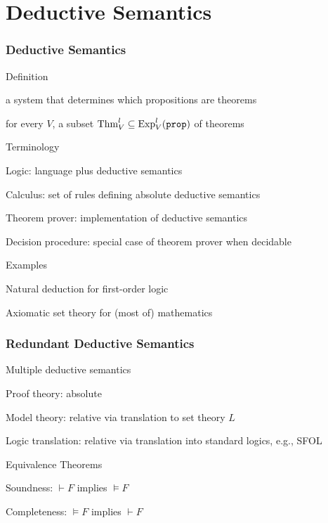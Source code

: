 \section{Deductive Semantics}

\begin{frame}\frametitle{Deductive Semantics}
\begin{blockitems}{Definition}
\item a system that determines which propositions are theorems
\item for every $V$, a subset $\Thm^l_V\sq \Exp^l_V(\prop)$ of theorems
\end{blockitems}

\begin{blockitems}{Terminology}
\item Logic: language plus deductive semantics
\item Calculus: set of rules defining absolute deductive semantics
\item Theorem prover: implementation of deductive semantics
\item Decision procedure: special case of theorem prover when decidable
\end{blockitems}

\begin{blockitems}{Examples}
\item Natural deduction for first-order logic
\item Axiomatic set theory for (most of) mathematics
\end{blockitems}
\end{frame}

\begin{frame}\frametitle{Redundant Deductive Semantics}
\begin{blockitems}{Multiple deductive semantics}
\item Proof theory: absolute
\item Model theory: relative via translation to set theory $L$
\item Logic translation: relative via translation into standard logics, e.g., SFOL
\end{blockitems}

\begin{blockitems}{Equivalence Theorems}
\item Soundness: $\vdash F$ implies $\models F$
\item Completeness: $\models F$ implies $\vdash F$
\end{blockitems}
\end{frame}

